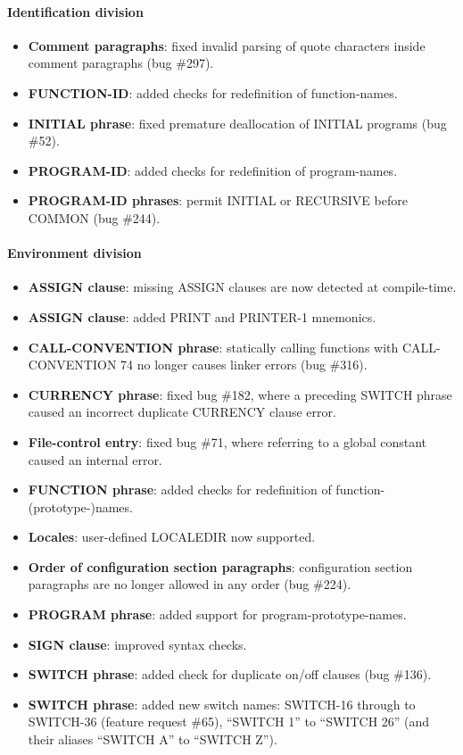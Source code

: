 \paragraph{Identification division}
\begin{itemize}
\item \textbf{Comment paragraphs}: fixed invalid parsing of quote characters inside comment paragraphs (bug \#297).
\item \textbf{FUNCTION-ID}: added checks for redefinition of function-names.
\item \textbf{INITIAL phrase}: fixed premature deallocation of INITIAL programs (bug \#52).
\item \textbf{PROGRAM-ID}: added checks for redefinition of program-names.
\item \textbf{PROGRAM-ID phrases}: permit INITIAL or RECURSIVE before COMMON (bug \#244).
\end{itemize}

\paragraph{Environment division}
\begin{itemize}
\item \textbf{ASSIGN clause}: missing ASSIGN clauses are now detected at compile-time.
\item \textbf{ASSIGN clause}: added PRINT and PRINTER-1 mnemonics.
\item \textbf{CALL-CONVENTION phrase}: statically calling functions with CALL-CONVENTION 74 no longer causes linker errors (bug \#316).
\item \textbf{CURRENCY phrase}: fixed bug \#182, where a preceding SWITCH phrase caused an incorrect duplicate CURRENCY clause error.
\item \textbf{File-control entry}: fixed bug \#71, where referring to a global constant caused an internal error.
\item \textbf{FUNCTION phrase}: added checks for redefinition of function-(prototype-)names.
\item \textbf{Locales}: user-defined LOCALEDIR now supported.
\item \textbf{Order of configuration section paragraphs}: configuration section paragraphs are no longer allowed in any order (bug \#224).
\item \textbf{PROGRAM phrase}: added support for program-prototype-names.
\item \textbf{SIGN clause}: improved syntax checks.
\item \textbf{SWITCH phrase}: added check for duplicate on\slash{}off clauses (bug \#136).
\item \textbf{SWITCH phrase}: added new switch names: SWITCH-16 through to SWITCH-36 (feature request \#65), ``SWITCH 1'' to ``SWITCH 26'' (and their aliases  ``SWITCH A'' to ``SWITCH Z'').
\end{itemize}

